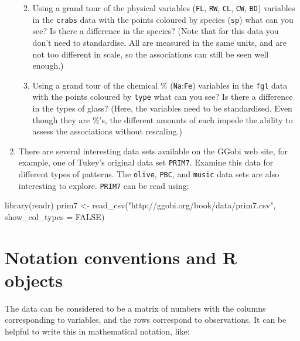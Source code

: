\documentclass[
  letterpaper,
]{krantz}
\newenvironment{Shaded}{\begin{snugshade}}{\end{snugshade}}
\newcommand{\AttributeTok}[1]{\textcolor[rgb]{0.40,0.45,0.13}{#1}}
\newcommand{\ConstantTok}[1]{\textcolor[rgb]{0.56,0.35,0.01}{#1}}
\newcommand{\FunctionTok}[1]{\textcolor[rgb]{0.28,0.35,0.67}{#1}}
\newcommand{\NormalTok}[1]{\textcolor[rgb]{0.00,0.23,0.31}{#1}}
\newcommand{\OtherTok}[1]{\textcolor[rgb]{0.00,0.23,0.31}{#1}}
\newcommand{\StringTok}[1]{\textcolor[rgb]{0.13,0.47,0.30}{#1}}
\providecommand{\tightlist}{%
  \setlength{\itemsep}{0pt}\setlength{\parskip}{0pt}}\usepackage{longtable,booktabs,array}
\begin{document}
\begin{enumerate}
  \begin{enumerate}
  \def\labelenumii{\alph{enumii}.}
  \tightlist
  \item
    Using a grand tour of the physical variables (\texttt{FL},
    \texttt{RW}, \texttt{CL}, \texttt{CW}, \texttt{BD}) variables in the
    \texttt{crabs} data with the points coloured by species
    (\texttt{sp}) what can you see? Is there a difference in the
    species? (Note that for this data you don't need to standardise. All
    are measured in the same units, and are not too different in scale,
    so the associations can still be seen well enough.)
  \item
    Using a grand tour of the chemical \% (\texttt{Na}:\texttt{Fe})
    variables in the \texttt{fgl} data with the points coloured by
    \texttt{type} what can you see? Is there a difference in the types
    of glass? (Here, the variables need to be standardised. Even though
    they are \%'s, the different amounts of each impede the ability to
    assess the associations without rescaling.)
  \end{enumerate}
\item
  There are several interesting data sets available on the GGobi web
  site, for example, one of Tukey's original data set \texttt{PRIM7}.
  Examine this data for different types of patterns. The \texttt{olive},
  \texttt{PBC}, and \texttt{music} data sets are also interesting to
  explore. \texttt{PRIM7} can be read using:
\end{enumerate}

\begin{Shaded}
\begin{Highlighting}[]
\FunctionTok{library}\NormalTok{(readr)}
\NormalTok{prim7 }\OtherTok{\textless{}{-}} \FunctionTok{read\_csv}\NormalTok{(}\StringTok{"http://ggobi.org/book/data/prim7.csv"}\NormalTok{,}
                  \AttributeTok{show\_col\_types =} \ConstantTok{FALSE}\NormalTok{)}
\end{Highlighting}
\end{Shaded}


\chapter{Notation conventions and R objects}\label{sec-notation}

The data can be considered to be a matrix of numbers with the columns
corresponding to variables, and the rows correspond to observations. It
can be helpful to write this in mathematical notation, like:
\end{document}
